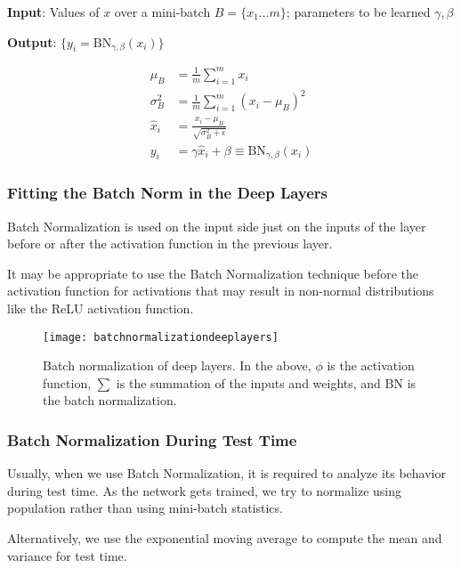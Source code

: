 	\vspace{\baselineskip}
	\begin{plainlist}
		\item {\bfseries Input}: Values of $x$ over a mini-batch $B = \{x_1 \ldots m \}$; parameters to be learned $\gamma, \beta$
		\item {\bfseries Output}: $\{ y_i = \textrm{B}\textrm{N}_{\gamma,\beta} \left(x_i\right) \}$
	\end{plainlist}

	\begin{align}
		\mu_B       &= \frac{1}{m} \sum_{i=1}^m x_i  \\
		\sigma_B^2  &= \frac{1}{m}  \sum_{i=1}^m \left( x_i - \mu_B \right)^2 \\
		\hat{x}_i   &= \frac{x_i - \mu_B}{\sqrt{\sigma_B^2 + \epsilon}}  \\
		y_i         &= \gamma\hat{x}_i + \beta \equiv \textrm{B}\textrm{N}_{\gamma,\beta} \left(x_i\right)
	\end{align}

	\subsubsection{Fitting the Batch Norm in the Deep Layers}
	\begin{bulletedlist}
		\item Batch Normalization is used on the input side just on the inputs of the layer before or after the activation function in the previous layer.
		\item It may be appropriate to use the Batch Normalization technique before the activation function for activations that may result in non-normal distributions like the ReLU activation function.
	\end{bulletedlist}

 	\begin{figure}[htb]
		\centering
		\texttt{[image: batchnormalizationdeeplayers]}
		\caption[Batch normalization of deep layers]{Batch normalization of deep layers.  In the above, $\phi$ is the activation function, $\sum$ is the summation of the inputs and weights, and BN is the batch normalization.}
		\label{fig:batchnormalizationdeeplayers}
	\end{figure}

	\subsubsection{Batch Normalization During Test Time}
	\begin{bulletedlist}
		\item Usually, when we use Batch Normalization, it is required to analyze its behavior during test time.  As the network gets trained, we try to normalize using population rather than using mini-batch statistics.
		\item Alternatively, we use the exponential moving average to compute the mean and variance for test time.
	\end{bulletedlist}


